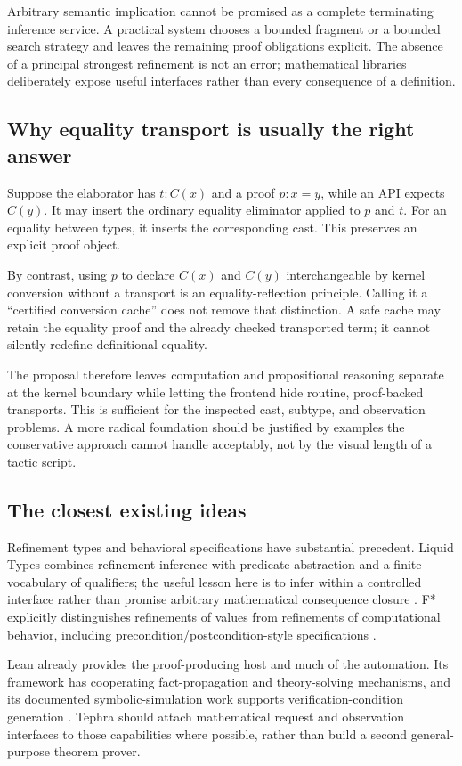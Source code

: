 \documentclass[11pt,a4paper]{article}
\newcommand{\code}[1]{\texttt{\detokenize{#1}}}
\theoremstyle{plain}
\theoremstyle{definition}
\begin{document}
Arbitrary semantic implication cannot be promised as a complete terminating inference service. A practical system chooses a bounded fragment or a bounded search strategy and leaves the remaining proof obligations explicit. The absence of a principal strongest refinement is not an error; mathematical libraries deliberately expose useful interfaces rather than every consequence of a definition.

\subsection{Why equality transport is usually the right answer}
Suppose the elaborator has $t:C(x)$ and a proof $p:x=y$, while an API expects $C(y)$. It may insert the ordinary equality eliminator applied to $p$ and $t$. For an equality between types, it inserts the corresponding cast. This preserves an explicit proof object.

By contrast, using $p$ to declare $C(x)$ and $C(y)$ interchangeable by kernel conversion without a transport is an equality-reflection principle. Calling it a ``certified conversion cache'' does not remove that distinction. A safe cache may retain the equality proof and the already checked transported term; it cannot silently redefine definitional equality.

The proposal therefore leaves computation and propositional reasoning separate at the kernel boundary while letting the frontend hide routine, proof-backed transports. This is sufficient for the inspected cast, subtype, and observation problems. A more radical foundation should be justified by examples the conservative approach cannot handle acceptably, not by the visual length of a tactic script.

\subsection{The closest existing ideas}
Refinement types and behavioral specifications have substantial precedent. Liquid Types combines refinement inference with predicate abstraction and a finite vocabulary of qualifiers; the useful lesson here is to infer within a controlled interface rather than promise arbitrary mathematical consequence closure \cite{liquid}. F* explicitly distinguishes refinements of values from refinements of computational behavior, including precondition/postcondition-style specifications \cite{fstar-values,fstar-effects}.

Lean already provides the proof-producing host and much of the automation. Its \code{grind} framework has cooperating fact-propagation and theory-solving mechanisms, and its documented symbolic-simulation work supports verification-condition generation \cite{lean-grind,lean-symbolic}. Tephra should attach mathematical request and observation interfaces to those capabilities where possible, rather than build a second general-purpose theorem prover.
\end{document}
